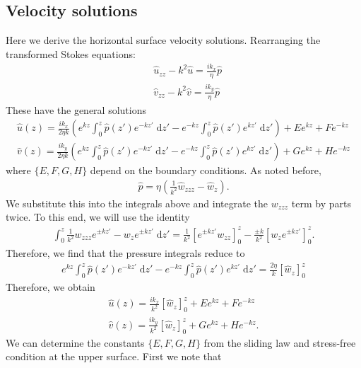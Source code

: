 \documentclass[paper=a4, fontsize=11pt]{article}
\begin{document}
\subsection*{Velocity solutions}
Here we derive the horizontal surface velocity solutions.
Rearranging the transformed Stokes equations:
\begin{align}
  &  \widehat{u}_{zz}-k^2\widehat{u} = \frac{ik_x}{\eta}\widehat{p} \\
  &  \widehat{v}_{zz}-k^2\widehat{v} = \frac{ik_y}{\eta}\widehat{p}
\end{align}
These have the general solutions
\begin{align}
\widehat{u}(z) = \frac{ik_x }{2\eta k} \left(e^{kz}\int_0^z \widehat{p}(z')e^{-kz'}\;\mathrm{d}z' -
e^{-kz}\int_0^z \widehat{p}(z')e^{kz'}\;\mathrm{d}z'\right)
+ E e^{kz} + F e^{-kz} \\
\widehat{v}(z) = \frac{ik_y }{2\eta k} \left(e^{kz}\int_0^z \widehat{p}(z')e^{-kz'}\;\mathrm{d}z' -
e^{-kz}\int_0^z \widehat{p}(z')e^{kz'}\;\mathrm{d}z'\right)
+ G e^{kz} + H e^{-kz}
\end{align}
where $\{E,F,G,H\}$ depend on the boundary conditions.
As noted before,
\begin{align}
\widehat{p} = \eta\left(\frac{1}{k^2}\widehat{w}_{zzz}-\widehat{w}_z \right).
\end{align}
We substitute this into the integrals above
and integrate the $w_{zzz}$ term by parts twice.
To this end, we will use the identity
\begin{align}
\int_0^z \frac{1}{k^2} w_{zzz} e^{\pm kz'} - w_{z} e^{\pm kz'}\;\mathrm{d}z'
= \frac{1}{k^2} \left[e^{\pm kz'}w_{zz}\right]_0^z - \frac{\pm k}{k^2}\left[w_ze^{\pm kz'} \right]_0^z.
\end{align}
Therefore, we find that the pressure integrals reduce to
\begin{align}
e^{kz}\int_0^z \widehat{p}(z')e^{-kz'}\;\mathrm{d}z' -
  e^{-kz}\int_0^z \widehat{p}(z')e^{kz'}\;\mathrm{d}z'
  = \frac{2\eta}{k} \left[\widehat{w}_z\right]_0^z
\end{align}
Therefore, we obtain
\begin{align}
\widehat{u}(z) = \frac{ik_x }{k^2} \left[\widehat{w}_z\right]_0^z
+ E e^{kz} + F e^{-kz} \\
\widehat{v}(z) = \frac{ik_y }{k^2} \left[\widehat{w}_z\right]_0^z + G e^{kz} + H e^{-kz}.
\end{align}
We can determine the constants $\{E,F,G,H\}$ from the sliding law and stress-free
condition at the upper surface.
First we note that
\end{document}
